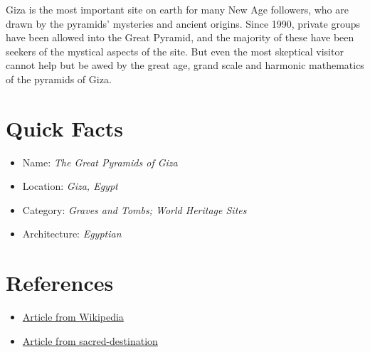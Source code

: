 \documentclass[12 pt]{article}
\begin{document}
Giza is the most important site on earth for many New Age followers, who are drawn by the pyramids' mysteries and ancient origins. Since 1990, private groups have been allowed into the Great Pyramid, and the majority of these have been seekers of the mystical aspects of the site. But even the most skeptical visitor cannot help but be awed by the great age, grand scale and harmonic mathematics of the pyramids of Giza.

\section{Quick Facts}
\begin{itemize}
\item{Name:} {\itshape The Great Pyramids of Giza}
\item{Location:} {\itshape Giza, Egypt}
\item{Category:} {\itshape Graves and Tombs; World Heritage Sites}
\item{Architecture:} {\itshape Egyptian}
\end{itemize}

\section{References}
\begin{itemize}

\item \href {http://en.wikipedia.org/wiki/Great_Pyramid_of_Giza}{Article from Wikipedia}

\item \href {http://www.sacred-destinations.com/egypt/giza-pyramids}{Article from sacred-destination}

\end{itemize}
\end{document}
